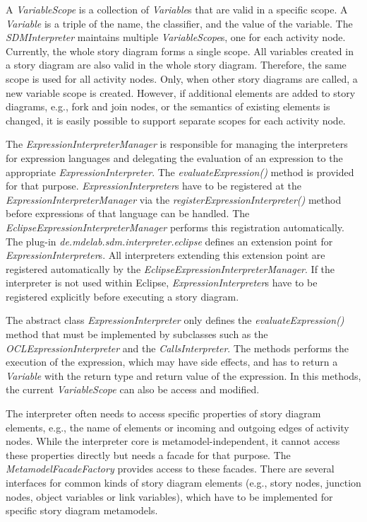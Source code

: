 A \emph{VariableScope} is a collection of \emph{Variable}s that are valid in a specific scope.
A \emph{Variable} is a triple of the name, the classifier, and the value of the variable.
The \emph{SDMInterpreter} maintains multiple \emph{VariableScope}s, one for each activity node.
Currently, the whole story diagram forms a single scope.
All variables created in a story diagram are also valid in the whole story diagram. 
Therefore, the same scope is used for all activity nodes.
Only, when other story diagrams are called, a new variable scope is created. 
However, if additional elements are added to story diagrams, e.g., fork and join nodes, or the semantics of existing elements is changed, it is easily possible to support separate scopes for each activity node.

The \emph{ExpressionInterpreterManager} is responsible for managing the interpreters for expression languages and delegating the evaluation of an expression to the appropriate \emph{ExpressionInterpreter}. 
The \emph{evaluateExpression()} method is provided for that purpose. 
\emph{ExpressionInterpreter}s have to be registered at the \emph{ExpressionInterpreterManager} via the \emph{registerExpressionInterpreter()} method before expressions of that language can be handled. 
The \emph{EclipseExpressionInterpreterManager} performs this registration automatically. 
The plug-in \emph{de.mdelab.sdm.interpreter.eclipse} defines an extension point for \emph{ExpressionInterpreter}s. 
All interpreters extending this extension point are registered automatically by the \emph{EclipseExpressionInterpreterManager}. 
If the interpreter is not used within Eclipse, \emph{ExpressionInterpreter}s have to be registered explicitly before executing a story diagram.

The abstract class \emph{ExpressionInterpreter} only defines the \emph{evaluateExpression()} method that must be implemented by subclasses such as the \emph{OCLExpressionInterpreter} and the \emph{CallsInterpreter}. The methods performs the execution of the expression, which may have side effects, and has to return a \emph{Variable} with the return type and return value of the expression. In this methods, the current \emph{VariableScope} can also be access and modified.

The interpreter often needs to access specific properties of story diagram elements, e.g., the name of elements or incoming and outgoing edges of activity nodes.
While the interpreter core is metamodel-independent, it cannot access these properties directly but needs a facade for that purpose.
The \emph{MetamodelFacadeFactory} provides access to these facades. 
There are several interfaces for common kinds of story diagram elements (e.g., story nodes, junction nodes, object variables or link variables), which have to be implemented for specific story diagram metamodels.

